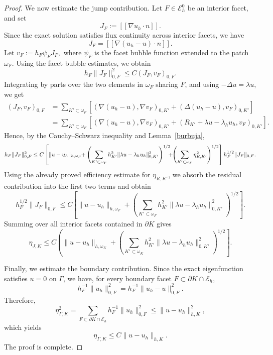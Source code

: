 \documentclass[onefignum,onetabnum,final]{siamart250211}
\numberwithin{equation}{section}
\newcommand\0{\boldsymbol{0}}
\begin{document}
\begin{proof}
We now estimate the jump contribution. Let $F\in\mathcal E_h^0$ be an interior facet, and set
\[
   J_F:=[\![\nabla u_h\cdot n]\!].
\]
Since the exact solution satisfies flux continuity across interior facets, we have
\[
   J_F=[\![\nabla(u_h-u)\cdot n]\!].
\]
Let $v_F:=h_F\psi_F J_F,$ where $\psi_F$ is the facet bubble function extended to the patch $\omega_F$. Using the facet bubble estimates, we obtain
\[
   h_F\|J_F\|_{0,F}^2 \le C(J_F,v_F)_{0,F}.
\]
Integrating by parts over the two elements in $\omega_F$ sharing $F$, and using $-\Delta u=\lambda u$, we get
\[
\begin{aligned}
(J_F,v_F)_{0,F} &= \sum_{K'\subset\omega_F} \left[ (\nabla(u_h-u),\nabla v_F)_{0,K'} + (\Delta(u_h-u),v_F)_{0,K'}\right] \\
&=
\sum_{K'\subset\omega_F} \left[ (\nabla(u_h-u),\nabla v_F)_{0,K'} + (R_{K'}+\lambda u-\lambda_hu_h,v_F)_{0,K'} \right].
\end{aligned}
\]
Hence, by the Cauchy--Schwarz inequality and Lemma~\ref{burbuja},
$$
h_F\|J_F\|_{0,F}^2 \le C\left[ \|u-u_h\|_{h,\omega_F} \hspace{-0.1cm}+ \left( \sum_{K'\subset\omega_F} h_{K'}^2\|\lambda u-\lambda_hu_h\|_{0,K'}^2 \right)^{1/2} \hspace{-0.2cm}+\hspace{-0.1cm} \left( \sum_{K'\subset\omega_F} \eta_{R,K'}^2 \right)^{1/2} \right] h_F^{1/2}\|J_F\|_{0,F}.
$$
Using the already proved efficiency estimate for $\eta_{R,K'}$, we absorb the residual contribution into the first two terms and obtain
\[
   h_F^{1/2}\|J_F\|_{0,F}\le C\left[\|u-u_h\|_{h,\omega_F}+\left(\sum_{K'\subset\omega_F}h_{K'}^2\|\lambda u-\lambda_hu_h\|_{0,K'}^2\right)^{1/2}\right].
\]
Summing over all interior facets contained in $\partial K$ gives
\[
   \eta_{J,K} \le C\left(\|u-u_h\|_{h,\omega_K} + \left(\sum_{K'\subset\omega_K}h_{K'}^2\|\lambda u-\lambda_hu_h\|_{0,K'}^2
   \right)^{1/2} \right].
\]

Finally, we estimate the boundary contribution. Since the exact eigenfunction satisfies $u=0$ on $\Gamma$, we have, for every boundary facet $F\subset\partial K\cap\mathcal E_h$,
\[
   h_F^{-1}\|u_h\|_{0,F}^2 = h_F^{-1}\|u_h-u\|_{0,F}^2.
\]
Therefore,
\[
   \eta_{\Gamma,K}^2  = \sum_{F\subset\partial K\cap\mathcal E_h}h_F^{-1}\|u_h\|_{0,F}^2 \le \|u-u_h\|_{h,K}^2,
\]
which yields
\[
   \eta_{\Gamma,K}  \le C\|u-u_h\|_{h,K}.
\]
The proof is complete.
\end{proof}
	
\end{document}
